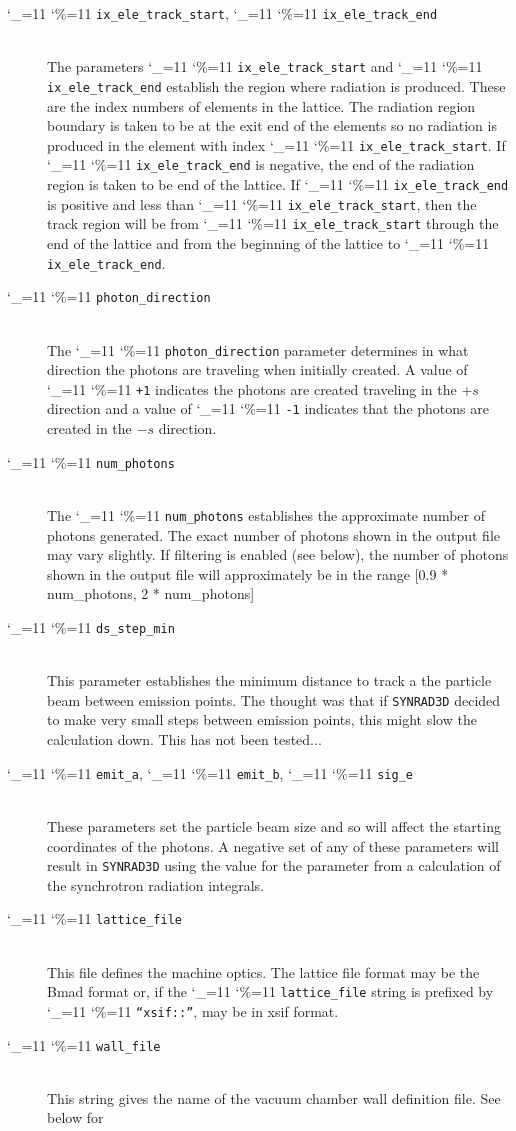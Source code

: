 \documentclass[11pt]{article}
\newcommand{\srthree}{\texttt{SYNRAD3D}\xspace}
\newcommand\ttcmd{\begingroup\catcode`\_=11 \catcode`\%=11 \dottcmd}
\newcommand\dottcmd[1]{\texttt{#1}\endgroup}
\newcommand{\vn}{\ttcmd}
\newcommand{\Newline}{\hfil \\}
\begin{document}
  \begin{description}
  \item[\vn{ix_ele_track_start}, \vn{ix_ele_track_end}] \Newline
The parameters \vn{ix_ele_track_start} and \vn{ix_ele_track_end} establish
the region where radiation is produced. These are the index numbers of 
elements in the lattice. The radiation region boundary is taken to be at
the exit end of the elements so no radiation is produced in the element
with index \vn{ix_ele_track_start}. If \vn{ix_ele_track_end} is negative,
the end of the radiation region is taken to be end of the lattice.
If \vn{ix_ele_track_end} is positive and less than \vn{ix_ele_track_start},
then the track region will be from \vn{ix_ele_track_start} through the
end of the lattice and from the beginning of the lattice to \vn{ix_ele_track_end}.
  \item[\vn{photon_direction}] \Newline
The \vn{photon_direction} parameter determines in what direction the photons
are traveling when initially created. A value of \vn{+1} indicates the photons
are created traveling in the $+s$ direction and a value of \vn{-1} indicates
that the photons are created in the $-s$ direction.
  \item[\vn{num_photons}] \Newline
The \vn{num_photons} establishes the approximate number of photons
generated.  The exact number of photons shown in the output file may vary
slightly. If filtering is enabled (see below), the number of photons shown
in the output file will approximately be in the range [0.9 * num_photons, 2 * num_photons]
  \item[\vn{ds_step_min}] \Newline
This parameter establishes the minimum distance to track a the particle beam between emission
points. The thought was that if \srthree decided to make very small steps  between emission
points, this might slow the calculation down. This has not been tested...
  \item[\vn{emit_a}, \vn{emit_b}, \vn{sig_e}] \Newline
These parameters set the particle beam size and so will affect the starting coordinates of
the photons. A negative set of any of these parameters will result in \srthree 
using the value for the parameter from a calculation of the synchrotron radiation integrals.
  \item[\vn{lattice_file}] \Newline
This file defines the
machine optics. The lattice file format may be the Bmad format or, if
the \vn{lattice_file} string is prefixed by \vn{``xsif::''},
may be in xsif format.
  \item[\vn{wall_file}] \Newline
This string gives the name of the vacuum chamber wall definition file. See below for

\end{description}
\end{document}

